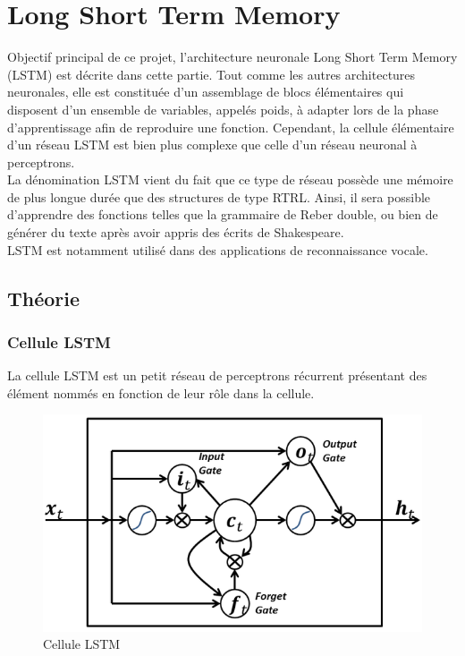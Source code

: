 
\chapter{Long Short Term Memory}
Objectif principal de ce projet, l'architecture neuronale Long Short Term Memory
(LSTM) est décrite dans cette partie. Tout comme les autres architectures
neuronales, elle est constituée d'un assemblage de blocs élémentaires qui
disposent d'un ensemble de variables, appelés poids, à adapter lors de la phase
d'apprentissage afin de reproduire une fonction. Cependant, la cellule
élémentaire d'un réseau LSTM est bien plus complexe que celle d'un réseau
neuronal à perceptrons. \\

La dénomination LSTM vient du fait que ce type de réseau possède une mémoire de
plus longue durée que des structures de type RTRL. Ainsi, il sera possible
d'apprendre des fonctions telles que la grammaire de Reber double, ou bien de
générer du texte après avoir appris des écrits de Shakespeare. \\
LSTM est notamment utilisé dans des applications de reconnaissance vocale.

\section{Théorie}
\subsection{Cellule LSTM}
La cellule LSTM est un petit réseau de perceptrons récurrent présentant des
élément nommés en fonction de leur rôle dans la cellule.

\begin{figure}[!ht]
\begin{center}
\includegraphics[scale=0.8]{images/lstm.png}
\end{center}
\caption{Cellule LSTM}
\end{figure}

